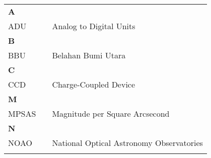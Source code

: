 \singkatan

\begin{flushleft}\vspace{0.5cm}
\begin{tabular}{p{1.5cm}p{2pt}l}
\textbf{A}\\
ADU & & Analog to Digital Units\\

\vspace{0.1cm}

\textbf{B}\\
BBU & & Belahan Bumi Utara\\
\vspace{0.1cm}

\textbf{C}\\
CCD & & Charge-Coupled Device\\
\vspace{0.1cm}

\textbf{M}\\
MPSAS & & Magnitude per Square Arcsecond\\
\vspace{0.1cm}

\textbf{N}\\
NOAO & & National Optical Astronomy Observatories\\
\vspace{0.1cm}


\end{tabular}
\end{flushleft}
